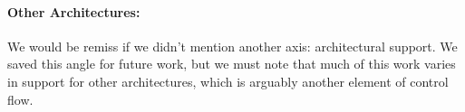 \paragraph{Other Architectures:} We would be remiss if we didn't mention another axis: architectural support. 
%
We saved this angle for future work, but we must note that much of this work varies in support for other architectures, which is arguably another element of control flow.




